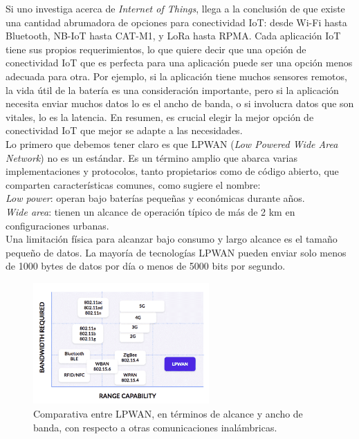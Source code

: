 \documentclass[12pt]{article}
\begin{document}
	\noindent Si uno investiga acerca de \textit{Internet of Things}, llega a la conclusión de que existe una cantidad abrumadora de opciones para conectividad IoT: desde Wi-Fi hasta Bluetooth, NB-IoT hasta CAT-M1, y LoRa hasta RPMA. Cada aplicación IoT tiene sus propios requerimientos, lo que quiere decir que una opción de conectividad IoT que es perfecta para una aplicación puede ser una opción menos adecuada para otra. Por ejemplo, si la aplicación tiene muchos sensores remotos, la vida útil de la batería es una consideración importante, pero si la aplicación necesita enviar muchos datos lo es el ancho de banda, o si involucra datos que son vitales, lo es la latencia. En resumen, es crucial elegir la mejor opción de conectividad IoT que mejor se adapte a las necesidades. \\
	
	\noindent Lo primero que debemos tener claro es que LPWAN (\textit{Low Powered Wide Area Network}) no es un estándar. Es un término amplio que abarca varias implementaciones y protocolos, tanto propietarios como de código abierto, que comparten características comunes, como sugiere el nombre: \\
	
	\noindent \textit{Low power}: operan bajo baterías pequeñas y económicas durante años. \\
	
	\noindent \textit{Wide area}: tienen un alcance de operación típico de más de 2 km en configuraciones urbanas.\\
	
	\noindent Una limitación física para alcanzar bajo consumo y largo alcance es el tamaño pequeño de datos. La mayoría de tecnologías LPWAN pueden enviar solo menos de 1000 bytes de datos por día o menos de 5000 bits por segundo. \\
	
	\begin{figure}[h]
		\begin{center}
			\includegraphics[width=0.6\textwidth]{img/LPWAN_comp.png}
			\caption{Comparativa entre LPWAN, en términos de alcance y ancho de banda, con respecto a otras comunicaciones inalámbricas.}
			\label{LPWANs vs otros}
		\end{center}
	\end{figure}
\end{document}
